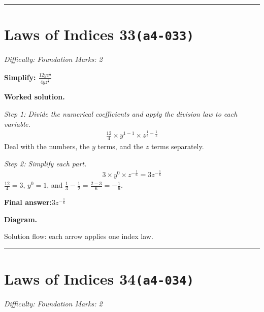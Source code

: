 \documentclass[11pt]{article}
\newcommand{\question}[1]{\par\medskip\noindent\textbf{#1}\par}
\begin{document}
\medskip\hrule

\section*{Laws of Indices 33\quad\small\texttt{(a4-033)}}
\textit{Difficulty: Foundation \quad\textbar\quad Marks: 2}

\question{Simplify: \( \frac{12y z^{\frac{1}{3}}}{4y z^{\frac{1}{2}}} \)}

\textbf{Worked solution.}

\textit{Step 1: Divide the numerical coefficients and apply the division law to each variable.}
\[\begin{gathered}
\frac{12}{4} \times y^{1-1} \times z^{\frac{1}{3}-\frac{1}{2}}
\end{gathered}\]
Deal with the numbers, the \( y \) terms, and the \( z \) terms separately.

\textit{Step 2: Simplify each part.}
\[\begin{gathered}
3 \times y^0 \times z^{-\frac{1}{6}} = 3z^{-\frac{1}{6}}
\end{gathered}\]
\( \frac{12}{4} = 3 \), \( y^0 = 1 \), and \( \frac{1}{3} - \frac{1}{2} = \frac{2-3}{6} = -\frac{1}{6} \).

\begin{answerbox}
\textbf{Final answer:}\quad \(\displaystyle 3z^{-\frac{1}{6}}\)
\end{answerbox}
\textbf{Diagram.}

\begin{center}
\end{center}
\small Solution flow: each arrow applies one index law.\normalsize

\medskip\hrule

\section*{Laws of Indices 34\quad\small\texttt{(a4-034)}}
\textit{Difficulty: Foundation \quad\textbar\quad Marks: 2}
\end{document}
